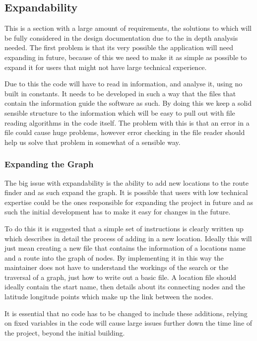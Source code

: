 \documentclass[10pt,a4paper]{article}
\begin{document}
\subsection{Expandability}
This is a section with a large amount of requirements, the solutions to which will be fully considered in the design documentation due to the in depth analysis needed. The first problem is that its very possible the application will need expanding in future, because of this we need to make it as simple as possible to expand it for users that might not have large technical experience. 

Due to this the code will have to read in information, and analyse it, using no built in constants. It needs to be developed in such a way that the files that contain the information guide the software as such. By doing this we keep a solid sensible structure to the information which will be easy to pull out with file reading algorithms in the code itself. The problem with this is that an error in a file could cause huge problems, however error checking in the file reader should help us solve that problem in somewhat of a sensible way. 
\subsubsection{Expanding the Graph}

The big issue with expandability is the ability to add new locations to the route finder and as such expand the graph. It is possible that users with low technical expertise could be the ones responsible for expanding the project in future and as such the initial development has to make it easy for changes in the future.

To do this it is suggested that a simple set of instructions is clearly written up which describes in detail the process of adding in a new location. Ideally this will just mean creating a new file that contains the information of a locations name and a route into the graph of nodes. By implementing it in this way the maintainer does not have to understand the workings of the search or the traversal of a graph, just how to write out a basic file. A location file should ideally contain the start name, then details about its connecting nodes and the latitude longitude points which make up the link between the nodes.

It is essential that no code has to be changed to include these additions, relying on fixed variables in the code will cause large issues further down the time line of the project, beyond the initial building. 
\end{document}
